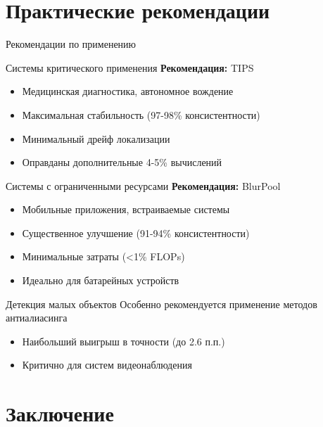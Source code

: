\documentclass[aspectratio=169]{beamer}
\begin{document}
\section{Практические рекомендации}

\begin{frame}{Рекомендации по применению}
    \begin{block}{Системы критического применения}
        \textbf{Рекомендация:} TIPS
        \begin{itemize}
            \item Медицинская диагностика, автономное вождение
            \item Максимальная стабильность (97-98\% консистентности)
            \item Минимальный дрейф локализации
            \item Оправданы дополнительные 4-5\% вычислений
        \end{itemize}
    \end{block}
    
    \begin{block}{Системы с ограниченными ресурсами}
        \textbf{Рекомендация:} BlurPool
        \begin{itemize}
            \item Мобильные приложения, встраиваемые системы
            \item Существенное улучшение (91-94\% консистентности)
            \item Минимальные затраты (<1\% FLOPs)
            \item Идеально для батарейных устройств
        \end{itemize}
    \end{block}
    
    \begin{block}{Детекция малых объектов}
        Особенно рекомендуется применение методов антиалиасинга
        \begin{itemize}
            \item Наибольший выигрыш в точности (до 2.6 п.п.)
            \item Критично для систем видеонаблюдения
        \end{itemize}
    \end{block}
\end{frame}

\section{Заключение}
\end{document}
